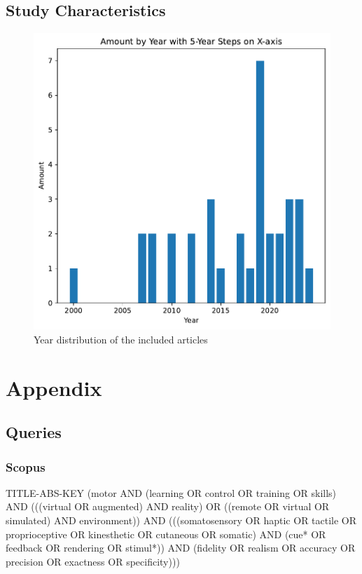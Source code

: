 \documentclass[conference]{IEEEtran}
\begin{document}
\subsection{Study Characteristics}
\begin{figure}[ht]
    \centering
    \includegraphics[width=\columnwidth]{years.pdf} 
    \caption{Year distribution of the included articles}
    \label{fig:prisma}
\end{figure}

\section*{Appendix}

\subsection{Queries}
\label{sec:queries}

\subsubsection{Scopus}
TITLE-ABS-KEY (motor AND (learning OR control OR training OR skills) AND (((virtual OR augmented) AND reality) OR ((remote OR virtual OR simulated) AND environment)) AND (((somatosensory OR haptic OR tactile OR proprioceptive OR kinesthetic OR cutaneous OR somatic) AND (cue* OR feedback OR rendering OR stimul*)) AND (fidelity OR realism OR accuracy OR precision OR exactness OR specificity)))
\end{document}
